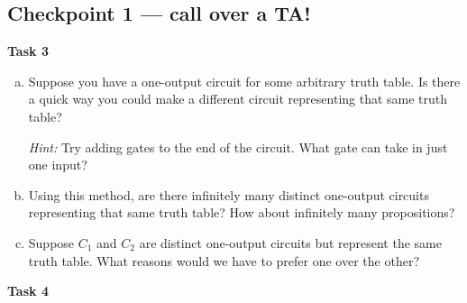 \documentclass[12pt,letterpaper]{article}
\newif\ifsol
\newcommand{\solu}[2]{ \begin{mdframed} \ifsol #2 \else \vspace{#1} \fi \end{mdframed} }
\begin{document}
\subsection*{Checkpoint 1 — call over a TA!}

\textbf{Task 3}

\begin{enumerate}[a.]

    \item Suppose you have a one-output circuit for some arbitrary truth table. Is there a quick way you could make a different circuit representing that same truth table?

    \textit{Hint:} Try adding gates to the end of the circuit. What gate can take in just one input?
    \solu{2cm}{Append two NOT gates to the end}

    \item Using this method, are there infinitely many distinct one-output circuits representing that same truth table? How about infinitely many propositions?
    \solu{2cm}{Yes, there are infinitely many one-output circuits, as well as infinitely many propositions, that represent the same truth table. We can simply just keep adding two NOTs to our circuit/proposition.}

    \item Suppose $C_1$ and $C_2$ are distinct one-output circuits but represent the same truth table. What reasons would we have to prefer one over the other? 

    \solu{2cm}{Size: Simple is good! An unnecessarily complicated circuit, such as one with many NOT gates appended to it, may not be most ideal or readable. It's also important to consider the meaning and context of the circuit.}

\end{enumerate}

\textbf{Task 4}
\end{document}

